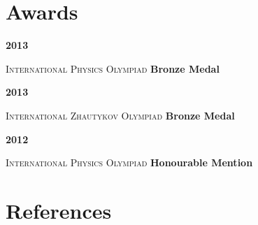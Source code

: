 \documentclass{article}
\newcommand{\bipart}[2]
{
  \noindent
  \begin{minipage}[h]{0.06\textwidth}
    #1
  \end{minipage}
  \vrule \hspace{0.15in}
  \begin{minipage}[h]{0.85\textwidth}
    #2
  \end{minipage}
  \vspace{0.15in}
  \normalsize
}
\newcommand{\award}[3]{
  \bipart{\textbf{#1}}
  {\large \textsc{#2} \normalsize \hfill \textbf{#3}}
}
\begin{document}
\section*{Awards}

\award{2013}{ International Physics Olympiad}{Bronze Medal}

\award{2013}{ International Zhautykov Olympiad}{Bronze Medal}

\award{2012}{ International Physics Olympiad}{Honourable Mention}

\section*{References}
\end{document}
